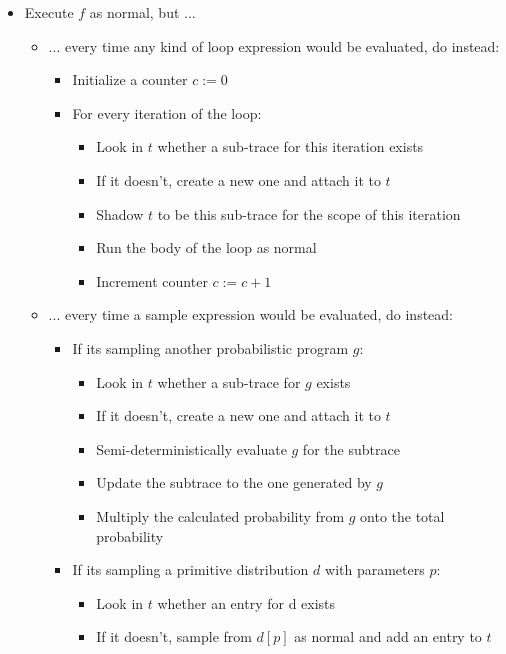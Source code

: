 \begin{minipage}{\linewidth}
\begin{itemize}
\item Execute $f$ as normal, but ...
  \begin{itemize}
  \item ... every time any kind of loop expression would be evaluated, do instead:
    \begin{itemize}
    \item Initialize a counter $c := 0$
    \item For every iteration of the loop:
      \begin{itemize}
      \item Look in $t$ whether a sub-trace for this iteration exists
      \item If it doesn't, create a new one and attach it to $t$
      \item Shadow $t$ to be this sub-trace for the scope of this iteration
      \item Run the body of the loop as normal
      \item Increment counter $c := c + 1$
      \end{itemize}
    \end{itemize}
  \item ... every time a sample expression would be evaluated, do instead:
    \begin{itemize}
    \item If its sampling another probabilistic program $g$:
      \begin{itemize}
      \item Look in $t$ whether a sub-trace for $g$ exists
      \item If it doesn't, create a new one and attach it to $t$
      \item Semi-deterministically evaluate $g$ for the subtrace
      \item Update the subtrace to the one generated by $g$
      \item Multiply the calculated probability from $g$ onto the total probability
      \end{itemize}
    \item If its sampling a primitive distribution $d$ with parameters $p$:
      \begin{itemize}
      \item Look in $t$ whether an entry for d exists
      \item If it doesn't, sample from $d[p]$ as normal and add an entry to $t$

\end{itemize}
\end{itemize}
\end{itemize}
\end{itemize}
\end{minipage}
